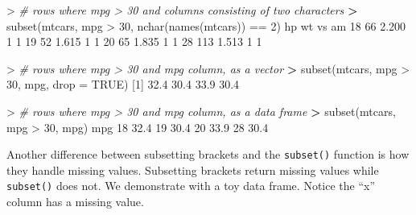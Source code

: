 \documentclass[
]{book}
\newenvironment{Shaded}{\begin{snugshade}}{\end{snugshade}}
\newcommand{\AttributeTok}[1]{\textcolor[rgb]{0.77,0.63,0.00}{#1}}
\newcommand{\CommentTok}[1]{\textcolor[rgb]{0.56,0.35,0.01}{\textit{#1}}}
\newcommand{\ConstantTok}[1]{\textcolor[rgb]{0.00,0.00,0.00}{#1}}
\newcommand{\DecValTok}[1]{\textcolor[rgb]{0.00,0.00,0.81}{#1}}
\newcommand{\ErrorTok}[1]{\textcolor[rgb]{0.64,0.00,0.00}{\textbf{#1}}}
\newcommand{\FloatTok}[1]{\textcolor[rgb]{0.00,0.00,0.81}{#1}}
\newcommand{\FunctionTok}[1]{\textcolor[rgb]{0.00,0.00,0.00}{#1}}
\newcommand{\NormalTok}[1]{#1}
\newcommand{\SpecialCharTok}[1]{\textcolor[rgb]{0.00,0.00,0.00}{#1}}
\begin{document}
\begin{Shaded}
\begin{Highlighting}[]
\SpecialCharTok{\textgreater{}} \CommentTok{\# rows where mpg \textgreater{} 30 and columns consisting of two characters}
\ErrorTok{\textgreater{}} \FunctionTok{subset}\NormalTok{(mtcars, mpg }\SpecialCharTok{\textgreater{}} \DecValTok{30}\NormalTok{, }\FunctionTok{nchar}\NormalTok{(}\FunctionTok{names}\NormalTok{(mtcars)) }\SpecialCharTok{==} \DecValTok{2}\NormalTok{)}
\NormalTok{    hp    wt vs am}
\DecValTok{18}  \DecValTok{66} \FloatTok{2.200}  \DecValTok{1}  \DecValTok{1}
\DecValTok{19}  \DecValTok{52} \FloatTok{1.615}  \DecValTok{1}  \DecValTok{1}
\DecValTok{20}  \DecValTok{65} \FloatTok{1.835}  \DecValTok{1}  \DecValTok{1}
\DecValTok{28} \DecValTok{113} \FloatTok{1.513}  \DecValTok{1}  \DecValTok{1}
\end{Highlighting}
\end{Shaded}

\begin{Shaded}
\begin{Highlighting}[]
\SpecialCharTok{\textgreater{}} \CommentTok{\# rows where mpg \textgreater{} 30 and mpg column, as a vector}
\ErrorTok{\textgreater{}} \FunctionTok{subset}\NormalTok{(mtcars, mpg }\SpecialCharTok{\textgreater{}} \DecValTok{30}\NormalTok{, mpg, }\AttributeTok{drop =} \ConstantTok{TRUE}\NormalTok{)}
\NormalTok{[}\DecValTok{1}\NormalTok{] }\FloatTok{32.4} \FloatTok{30.4} \FloatTok{33.9} \FloatTok{30.4}
\end{Highlighting}
\end{Shaded}

\begin{Shaded}
\begin{Highlighting}[]
\SpecialCharTok{\textgreater{}} \CommentTok{\# rows where mpg \textgreater{} 30 and mpg column, as a data frame}
\ErrorTok{\textgreater{}} \FunctionTok{subset}\NormalTok{(mtcars, mpg }\SpecialCharTok{\textgreater{}} \DecValTok{30}\NormalTok{, mpg)}
\NormalTok{    mpg}
\DecValTok{18} \FloatTok{32.4}
\DecValTok{19} \FloatTok{30.4}
\DecValTok{20} \FloatTok{33.9}
\DecValTok{28} \FloatTok{30.4}
\end{Highlighting}
\end{Shaded}

Another difference between subsetting brackets and the \texttt{subset()} function is how they handle missing values. Subsetting brackets return missing values while \texttt{subset()} does not. We demonstrate with a toy data frame. Notice the ``x'' column has a missing value.
\end{document}
